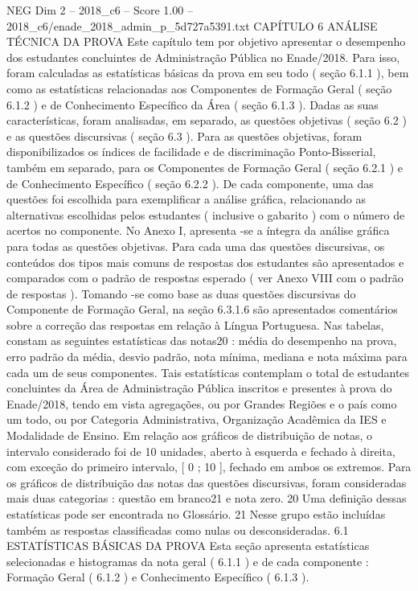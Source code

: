 \begin{textsample}{NEG Dim 2 – 2018\_c6 – Score 1.00 – 2018\_c6/enade\_2018\_admin\_p\_5d727a5391.txt}  \label{ex:f2_neg_239}
CAPÍTULO 6 ANÁLISE TÉCNICA DA PROVA Este capítulo tem por objetivo apresentar o desempenho dos estudantes concluintes de Administração Pública no Enade/2018.
Para isso, foram calculadas as estatísticas básicas da prova em seu todo ( seção 6.1.1 ), bem como as estatísticas relacionadas aos Componentes de Formação Geral ( seção 6.1.2 ) e de Conhecimento Específico da Área ( seção 6.1.3 ).
Dadas as suas características, foram analisadas, em separado, as questões objetivas ( seção 6.2 ) e as questões discursivas ( seção 6.3 ).
Para as questões objetivas, foram disponibilizados os índices de facilidade e de discriminação Ponto-Bisserial, também em separado, para os Componentes de Formação Geral ( seção 6.2.1 ) e de Conhecimento Específico ( seção 6.2.2 ).
De cada componente, uma das questões foi escolhida para exemplificar a análise gráfica, relacionando as alternativas escolhidas pelos estudantes ( inclusive o gabarito ) com o número de acertos no componente.
No Anexo I, apresenta -se a íntegra da análise gráfica para todas as questões objetivas.
Para cada uma das questões discursivas, os conteúdos dos tipos mais comuns de respostas dos estudantes são apresentados e comparados com o padrão de respostas esperado ( ver Anexo VIII com o padrão de respostas ).
Tomando -se como base as duas questões discursivas do Componente de Formação Geral, na seção 6.3.1.6 são apresentados comentários sobre a correção das respostas em relação à Língua Portuguesa.
Nas tabelas, constam as seguintes estatísticas das notas20 : média do desempenho na prova, erro padrão da média, desvio padrão, nota mínima, mediana e nota máxima para cada um de seus componentes.
Tais estatísticas contemplam o total de estudantes concluintes da Área de Administração Pública inscritos e presentes à prova do Enade/2018, tendo em vista agregações, ou por Grandes Regiões e o país como um todo, ou por Categoria Administrativa, Organização Acadêmica da IES e Modalidade de Ensino.
Em relação aos gráficos de distribuição de notas, o intervalo considerado foi de 10 unidades, aberto à esquerda e fechado à direita, com exceção do primeiro intervalo, [ 0 ; 10 ], fechado em ambos os extremos.
Para os gráficos de distribuição das notas das questões discursivas, foram consideradas mais duas categorias : questão em branco21 e nota zero. 20 Uma definição dessas estatísticas pode ser encontrada no Glossário. 21 Nesse grupo estão incluídas também as respostas classificadas como nulas ou desconsideradas. 6.1 ESTATÍSTICAS BÁSICAS DA PROVA Esta seção apresenta estatísticas selecionadas e histogramas da nota geral ( 6.1.1 ) e de cada componente : Formação Geral ( 6.1.2 ) e Conhecimento Específico ( 6.1.3 ).

\end{textsample}
